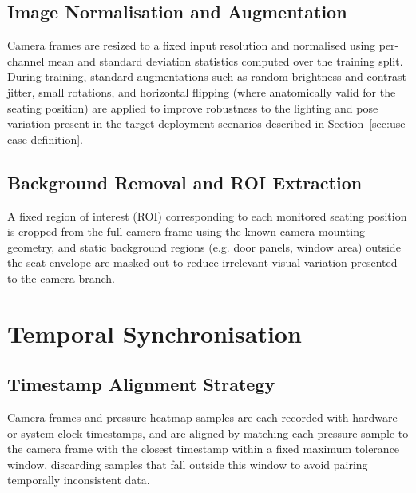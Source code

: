 \subsection{Image Normalisation and Augmentation}
\label{sec:camera-normalisation-augmentation}
Camera frames are resized to a fixed input resolution and normalised
using per-channel mean and standard deviation statistics computed over
the training split. During training, standard augmentations such as
random brightness and contrast jitter, small rotations, and horizontal
flipping (where anatomically valid for the seating position) are applied
to improve robustness to the lighting and pose variation present in the
target deployment scenarios described in Section~\ref{sec:use-case-definition}.

\subsection{Background Removal and ROI Extraction}
\label{sec:camera-roi-extraction}
A fixed region of interest (ROI) corresponding to each monitored seating
position is cropped from the full camera frame using the known camera
mounting geometry, and static background regions (e.g. door panels,
window area) outside the seat envelope are masked out to reduce
irrelevant visual variation presented to the camera branch.

\section{Temporal Synchronisation}
\label{sec:temporal-synchronisation}

\subsection{Timestamp Alignment Strategy}
\label{sec:timestamp-alignment}
Camera frames and pressure heatmap samples are each recorded with
hardware or system-clock timestamps, and are aligned by matching each
pressure sample to the camera frame with the closest timestamp within a
fixed maximum tolerance window, discarding samples that fall outside this
window to avoid pairing temporally inconsistent data.

